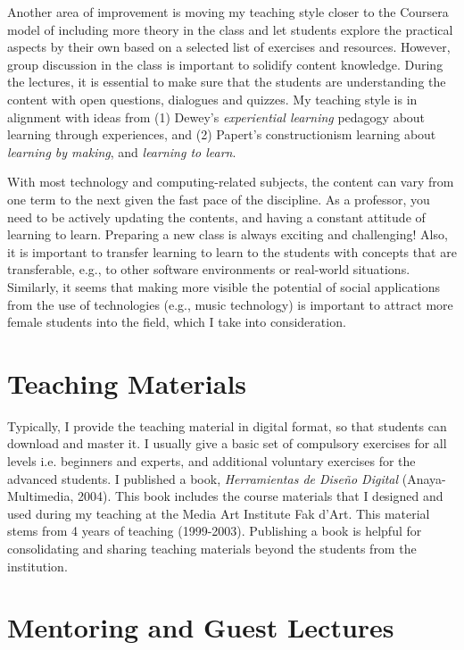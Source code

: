 \documentclass[10pt, a4paper]{article}
\begin{document}
Another area of improvement is moving my teaching style closer to the Coursera model of including more theory in the class and let students explore the practical aspects by their own based on a selected list of exercises and resources. However, group discussion in the class is important to solidify content knowledge. During the lectures, it is essential to make sure that the students are understanding the content with open questions, dialogues and quizzes. My teaching style is in alignment with ideas from (1) Dewey's \emph{experiential learning} pedagogy about learning through experiences, and (2) Papert's constructionism learning about \emph{learning by making}, and \emph{learning to learn}.

With most technology and computing-related subjects, the content can vary from one term to the next given the fast pace of the discipline. As a professor, you need to be actively updating the contents, and having a constant attitude of learning to learn. Preparing a new class is always exciting and challenging! Also, it is important to transfer learning to learn to the students with concepts that are transferable, e.g., to other software environments or real-world situations. Similarly, it seems that making more visible the potential of social applications from the use of technologies (e.g., music technology) is important to attract more female students into the field, which I take into consideration.  

\section*{Teaching Materials}

Typically, I provide the teaching material in digital format, so that students can download and master it. I usually give a basic set of compulsory exercises for all levels i.e. beginners and experts, and additional voluntary exercises for the advanced students. I published a book, \emph{Herramientas de Diseño Digital} (Anaya-Multimedia, 2004). This book includes the course materials that I designed and used during my teaching at the Media Art Institute Fak d'Art. This material stems from 4 years of teaching (1999-2003). Publishing a book is helpful for consolidating and sharing teaching materials beyond the students from the institution. 

\section*{Mentoring and Guest Lectures}
\end{document}
